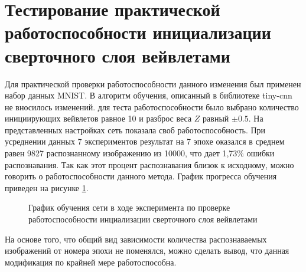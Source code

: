 \documentclass[utf8,usehyperref,14pt]{G7-32}
\begin{document}
\section{Тестирование практической работоспособности инициализации сверточного слоя вейвлетами}
Для практической проверки работоспособности данного изменения был применен набор данных MNIST. В алгоритм обучения, описанный в библиотеке tiny-cnn  не вносилось изменений. для теста работоспособности было выбрано количество инициирующих вейвлетов равное 10 и разброс веса  $ Z $ равный $ \pm 0.5 $. На представленных настройках сеть показала своб работоспособность. При усреднении данных 7 экспериментов результат на 7 эпохе оказался в среднем равен 9827 распознанному изображению из 10000, что дает 1,73\% ошибки распознавания. Так как этот процент распознавания близок к исходному, можно говорить о работоспособности данного метода. График прогресса обучения приведен на рисунке \ref{conwave_5_05}.
\begin{figure}[H]
  \caption{График обучения сети в ходе эксперимента по проверке работоспособности инциализации сверточного слоя вейвлетами}\label{conwave_5_05}
\end{figure}
На основе того, что общий вид зависимости количества распознаваемых изображений от номера эпохи не поменялся, можно сделать вывод, что данная модификация по крайней мере работоспособна.
\end{document}
